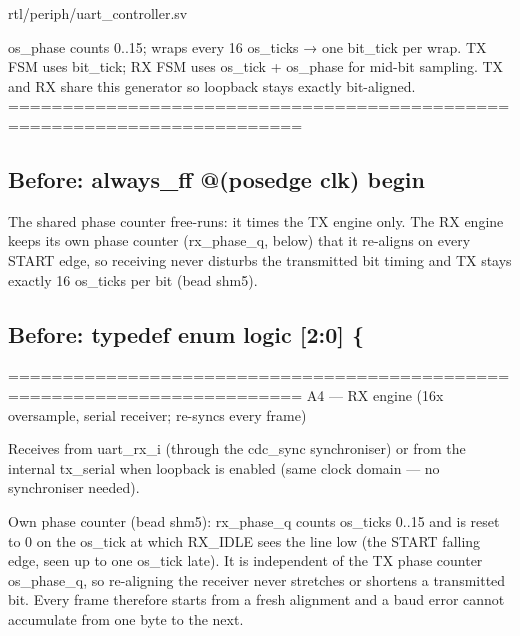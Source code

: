 \begin{relocated}{rtl/periph/uart_controller.sv}
\begin{textblock}
os_phase counts 0..15; wraps every 16 os_ticks → one bit_tick per wrap.
TX FSM uses bit_tick; RX FSM uses os_tick + os_phase for mid-bit sampling.
TX and RX share this generator so loopback stays exactly bit-aligned.
=========================================================================
\end{textblock}

\subsection*{Before: always\_ff @(posedge clk) begin}

\begin{textblock}
The shared phase counter free-runs: it times the TX engine only.  The RX
engine keeps its own phase counter (rx_phase_q, below) that it re-aligns on
every START edge, so receiving never disturbs the transmitted bit timing
and TX stays exactly 16 os_ticks per bit (bead shm5).
\end{textblock}

\subsection*{Before: typedef enum logic [2:0] \{}

\begin{textblock}
=========================================================================
A4 — RX engine (16x oversample, serial receiver; re-syncs every frame)

Receives from uart_rx_i (through the cdc_sync synchroniser) or from the
internal tx_serial when loopback is enabled (same clock domain — no
synchroniser needed).

Own phase counter (bead shm5):
  rx_phase_q counts os_ticks 0..15 and is reset to 0 on the os_tick at
  which RX_IDLE sees the line low (the START falling edge, seen up to one
  os_tick late).  It is independent of the TX phase counter os_phase_q, so
  re-aligning the receiver never stretches or shortens a transmitted bit.
  Every frame therefore starts from a fresh alignment and a baud error
  cannot accumulate from one byte to the next.


\end{textblock}
\end{relocated}
